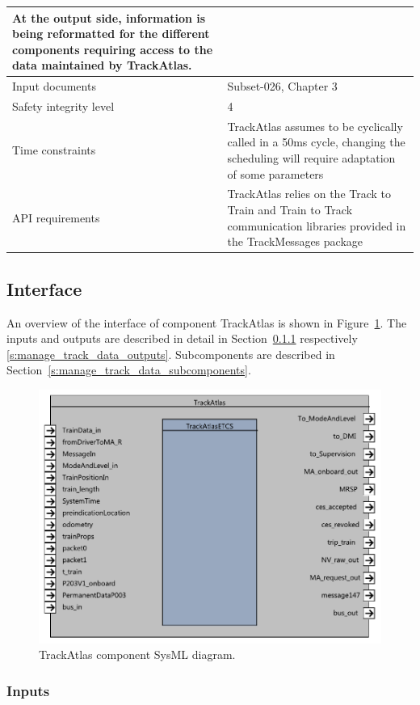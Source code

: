 \begin{longtable}{p{}p{}}
At the output side, information is being reformatted for the different components requiring access to the data maintained by TrackAtlas.
 \\
\midrule
Input documents	& 
Subset-026, Chapter 3\\
\midrule
Safety integrity level	& 4 \\
\midrule
Time constraints		& TrackAtlas assumes to be cyclically called in a 50ms cycle, changing the scheduling will require adaptation of some parameters \\
\midrule
API requirements 		& TrackAtlas relies on the Track to Train and Train to Track communication libraries provided in the TrackMessages package \\
\bottomrule
\end{longtable}


\subsection{Interface}

An overview of the interface of component TrackAtlas is shown in Figure~\ref{f:manage_track_data_interface}. The inputs and outputs are described in detail in Section~\ref{s:manage_track_data_inputs} respectively \ref{s:manage_track_data_outputs}. Subcomponents are described in Section~\ref{s:manage_track_data_subcomponents}.

\begin{figure}[H]
\center
\includegraphics[width=.8\textwidth]{images/F2_4_TrackAtlas.pdf}
\caption{TrackAtlas component SysML diagram.}\label{f:manage_track_data_interface}
\end{figure}


\subsubsection{Inputs}\label{s:manage_track_data_inputs}


